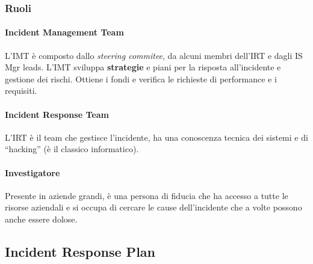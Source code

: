 \subsubsection{Ruoli}

\paragraph*{Incident Management Team} L'IMT è composto dallo
\textit{steering commitee}, da alcuni membri dell'IRT e dagli IS Mgr
leads. L'IMT sviluppa \textbf{strategie} e
piani per la risposta all'incidente e gestione dei rischi.
Ottiene i fondi e verifica le richieste di performance e i requisiti.

\paragraph*{Incident Response Team} L'IRT è il
team che gestisce l'incidente, ha una conoscenza tecnica dei sistemi e di
``hacking'' (è il classico informatico).

\paragraph*{Investigatore} Presente in aziende grandi, è una persona di fiducia
che ha accesso a tutte le risorse aziendali e si occupa di cercare le cause
dell'incidente che a volte possono anche essere dolose.



\subsection{Incident Response Plan}

